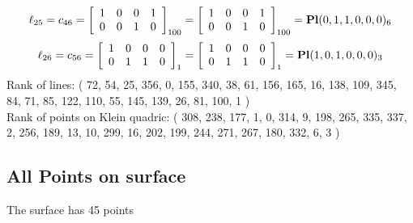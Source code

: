 $$
\ell_{25} = c_{46} = 
\left[
\begin{array}{*{4}{r}}
1 & 0 & 0 & 1\\
0 & 0 & 1 & 0\\
\end{array}
\right]
_{100}
=
\left[
\begin{array}{*{4}c}
1  & 0  & 0  & 1\\
0  & 0  & 1  & 0\\
\end{array}
\right]_{100}
={\rm\bf Pl}(0,1,1,0,0,0 )_{6}$$
$$
\ell_{26} = c_{56} = 
\left[
\begin{array}{*{4}{r}}
1 & 0 & 0 & 0\\
0 & 1 & 1 & 0\\
\end{array}
\right]
_{1}
=
\left[
\begin{array}{*{4}c}
1  & 0  & 0  & 0\\
0  & 1  & 1  & 0\\
\end{array}
\right]_{1}
={\rm\bf Pl}(1,0,1,0,0,0 )_{3}$$
Rank of lines: ( 72, 54, 25, 356, 0, 155, 340, 38, 61, 156, 165, 16, 138, 109, 345, 84, 71, 85, 122, 110, 55, 145, 139, 26, 81, 100, 1 )\\
Rank of points on Klein quadric: ( 308, 238, 177, 1, 0, 314, 9, 198, 265, 335, 337, 2, 256, 189, 13, 10, 299, 16, 202, 199, 244, 271, 267, 180, 332, 6, 3 )\\
\subsection*{All Points on surface}
The surface has 45 points\\
